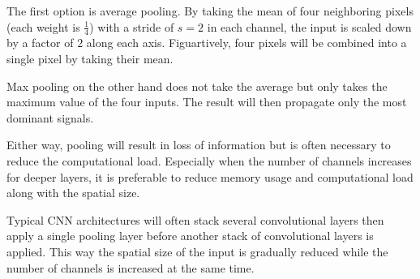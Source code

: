 The first option is average pooling.
By taking the mean of four neighboring pixels (each weight is $\frac{1}{4}$) with a stride of $s = 2$ in each channel, the input is scaled down by a factor of $2$ along each axis.
Figuartively, four pixels will be combined into a single pixel by taking their mean.

Max pooling on the other hand does not take the average but only takes the maximum value of the four inputs.
The result will then propagate only the most dominant signals.

Either way, pooling will result in loss of information but is often necessary to reduce the computational load.
Especially when the number of channels increases for deeper layers, it is preferable to reduce memory usage and computational load along with the spatial size.

Typical CNN architectures will often stack several convolutional layers then apply a single pooling layer before another stack of convolutional layers is applied.
This way the spatial size of the input is gradually reduced while the number of channels is increased at the same time.
 
